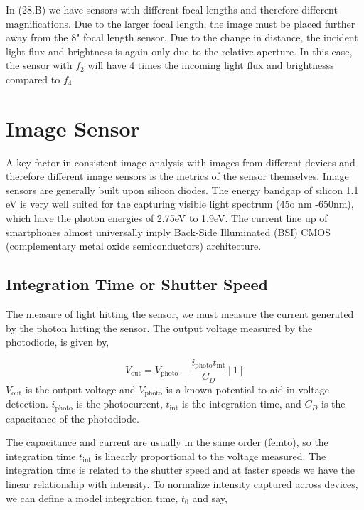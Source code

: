 \documentclass{article}
\begin{document}
In (28.B) we have sensors with different focal lengths and therefore different magnifications.
Due to the larger focal length, the image must be placed further away from the 8" focal length sensor.
Due to the change in distance, the incident light flux and brightness is again only due to
the relative aperture. In this case, the sensor with $ f_2$ will have 4 times the incoming light flux
and brightnesss compared to $ f_4$

\section{Image Sensor}


A key factor in consistent image analysis with images from different devices
and therefore different image sensors is the metrics of the sensor themselves.
Image sensors are generally built upon silicon diodes. The energy bandgap
of silicon 1.1 eV is very well suited for the capturing visible light spectrum (45o nm -650nm), which
have the photon energies of 2.75eV to 1.9eV. The current line up of smartphones almost universally imply
Back-Side Illuminated (BSI)
CMOS
 (complementary metal oxide semiconductors) architecture.


\subsection{Integration Time or Shutter Speed}

The measure of light hitting the sensor, we must measure the current generated
by the photon hitting the sensor. The output voltage measured by the photodiode,
is given by,

\begin{equation}
  V_{\text{out}} = V_{\text{photo}} - \frac{i_{\text{photo}}t_{\text{int}}}{C_{D}}[1]
\end{equation}
$V_{\text{out}}$ is the output voltage and $V_{\text{photo}} $ is a known
potential to aid in voltage detection.
$ i_{\text{photo}}$ is the photocurrent, $t_{\text{int}}$ is the integration time,
and $C_D $ is the capacitance of the photodiode.

The capacitance and current are usually in the same order (femto), so the integration
time $ t_{\text{int}}$ is linearly proportional to the voltage measured. The integration
time is related to the shutter speed and at faster speeds we have the linear relationship
with intensity. To normalize intensity captured across devices, we can define a model
integration time, $ t_0$ and say,
\end{document}
